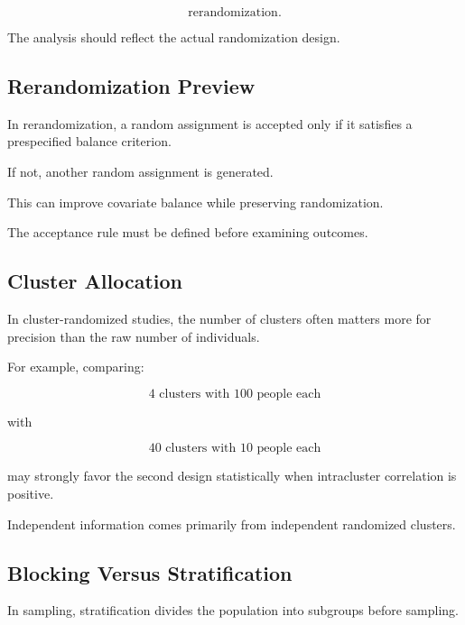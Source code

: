 \[
\boxed{
\text{rerandomization}.
}
\]

The analysis should reflect the actual randomization design.

\subsection{Rerandomization Preview}
\label{subsec:rerandomization-preview}

In rerandomization, a random assignment is accepted only if it satisfies
a prespecified balance criterion.

If not, another random assignment is generated.

This can improve covariate balance while preserving randomization.

The acceptance rule must be defined before examining outcomes.

\subsection{Cluster Allocation}
\label{subsec:cluster-allocation}

In cluster-randomized studies, the number of clusters often matters more
for precision than the raw number of individuals.

For example, comparing:

\[
\boxed{
4\text{ clusters with }100\text{ people each}
}
\]

with

\[
\boxed{
40\text{ clusters with }10\text{ people each}
}
\]

may strongly favor the second design statistically when intracluster
correlation is positive.

Independent information comes primarily from independent randomized
clusters.

\subsection{Blocking Versus Stratification}
\label{subsec:blocking-versus-stratification}

In sampling, stratification divides the population into subgroups before
sampling.

